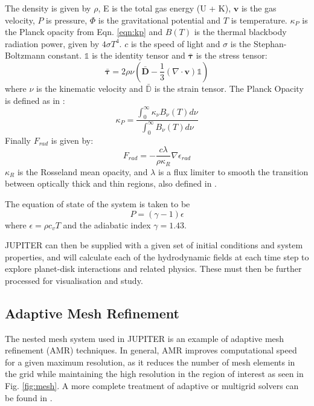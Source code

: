 \documentclass[preprint2]{aastex62}
\begin{document}
The density is given by $\rho$, E is the total gas energy (U + K), $\mathbf{v}$ is the gas velocity, $P$ is pressure, $\Phi$ is the gravitational potential and $T$ is temperature. $\kappa_{P}$ is the Planck opacity from Eqn. \ref{eqn:kp} and $B(T)$ is the thermal blackbody radiation power, given by $4\sigma T^{4}$. $c$ is the speed of light and $\sigma$ is the Stephan-Boltzmann constant. $\mathds{1}$ is the identity tensor and $\bm{\bar{\tau}}$ is the stress tensor:
\begin{equation}
\bm{\bar{\tau}} = 2\rho\nu\left(\bm{\bar{D}} - \frac{1}{3}\left(\nabla\cdot\mathbf{v}\right)\mathds{1}\right)
\end{equation}
where $\nu$ is the kinematic velocity and $\mathds{\bar{D}}$ is the strain tensor. 
The Planck Opacity is defined as in \cite{Bitsch2013}:
\begin{equation}\label{eqn:kp}
\kappa_{P} = \frac{\int_{0}^{\infty}\kappa_{\nu}B_{\nu}\left(T\right)d\nu}{\int_{0}^{\infty}B_{\nu}\left(T\right)d\nu}
\end{equation}
Finally $F_{rad}$ is given by:
\begin{equation}
F_{rad} = -\frac{c\lambda}{\rho\kappa_{R}}\nabla\epsilon_{rad}
\end{equation}
$\kappa_{R}$ is the Rosseland mean opacity, and $\lambda$ is a flux limiter to smooth the transition between optically thick and thin regions, also defined in \cite{Bitsch2013}.

The equation of state of the system is taken to be 
\begin{equation}
P = \left(\gamma - 1\right)\epsilon
\end{equation}
where $\epsilon = \rho c_{v}T$ and the adiabatic index $\gamma = 1.43$.

JUPITER can then be supplied with a given set of initial conditions and system properties, and will calculate each of the hydrodynamic fields at each time step to explore planet-disk interactions and related physics. These must then be further processed for visualisation and study.
\subsection{Adaptive Mesh Refinement}\label{sec:amr}
The nested mesh system used in JUPITER is an example of adaptive mesh refinement (AMR) techniques. 
In general, AMR improves computational speed for a given maximum resolution, as it reduces the number of mesh elements in the grid while maintaining the high resolution in the region of interest as seen in Fig. \ref{fig:mesh}. A more complete treatment of adaptive or multigrid solvers can be found in \cite{hockney1988computer}. 
\end{document}
